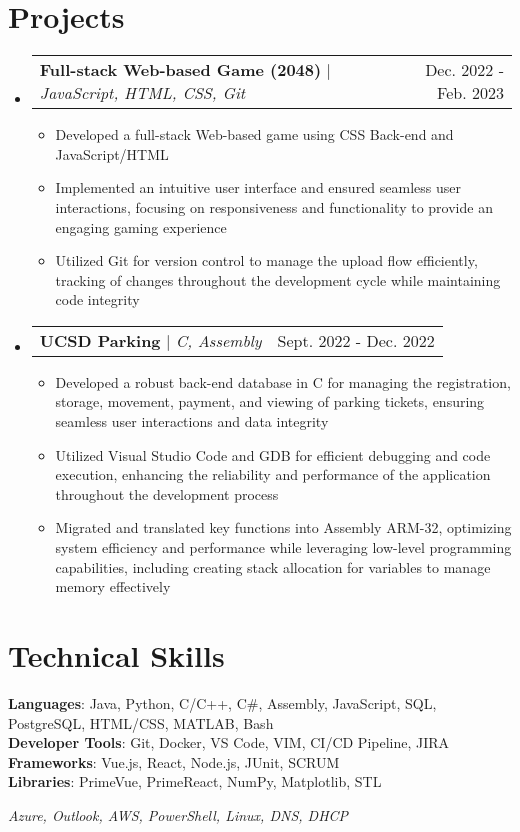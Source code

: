 \documentclass[letterpaper,11pt]{article}
\makeatletter
\newcommand{\resumeItem}[1]{
      \item\small{
        {#1 \vspace{-2pt}}
      }
    }
\newcommand{\resumeProjectHeading}[2]{
        \item
        \begin{tabular*}{0.97\textwidth}{l@{\extracolsep{\fill}}r}
          \small#1 & #2 \\
        \end{tabular*}\vspace{-7pt}
    }
\newcommand{\resumeSubHeadingListStart}{\begin{itemize}[leftmargin=0.15in, label={}]}
\newcommand{\resumeSubHeadingListEnd}{\end{itemize}}
\newcommand{\resumeItemListStart}{\begin{itemize}}
\newcommand{\resumeItemListEnd}{\end{itemize}\vspace{-5pt}}
\makeatother
\begin{document}
    \section{Projects}
        \resumeSubHeadingListStart
          \resumeProjectHeading
              {\textbf{Full-stack Web-based Game (2048)} $|$ \emph{JavaScript, HTML, CSS, Git}}{Dec. 2022 - Feb. 2023}
              \resumeItemListStart
                \resumeItem{Developed a full-stack Web-based game using CSS Back-end and JavaScript/HTML}
                \resumeItem{Implemented an intuitive user interface and ensured seamless user interactions, focusing on responsiveness and functionality to provide an engaging gaming experience}
                \resumeItem{Utilized Git for version control to manage the upload flow efficiently, tracking of changes throughout the development cycle while maintaining code integrity}
              \resumeItemListEnd
            \resumeProjectHeading
              {\textbf{UCSD Parking} $|$ \emph{C, Assembly}}{Sept. 2022 - Dec. 2022}
              \resumeItemListStart
                \resumeItem{Developed a robust back-end database in C for managing the registration, storage, movement, payment, and viewing of parking tickets, ensuring seamless user interactions and data integrity}
                \resumeItem{Utilized Visual Studio Code and GDB for efficient debugging and code execution, enhancing the reliability and performance of the application throughout the development process}
                \resumeItem{Migrated and translated key functions into Assembly ARM-32, optimizing system efficiency and performance while leveraging low-level programming capabilities, including creating stack allocation for variables to manage memory effectively}
              \resumeItemListEnd
        \resumeSubHeadingListEnd
    
    
    
    \section{Technical Skills}
     \begin{itemize}[leftmargin=0.15in, label={}]
        \small{\item{
         \textbf{Languages}{: Java, Python, C/C++, C\#, Assembly, JavaScript, SQL, PostgreSQL, HTML/CSS, MATLAB, Bash} \\
         \textbf{Developer Tools}{: Git, Docker, VS Code, VIM, CI/CD Pipeline, JIRA} \\
         \textbf{Frameworks}{: Vue.js, React, Node.js, JUnit, SCRUM} \\
         \textbf{Libraries}{: PrimeVue, PrimeReact, NumPy, Matplotlib, STL}
        }}
     \end{itemize}
     \begin{itemize}[leftmargin=0.15in, label={}]
      \small{\item{
         \color{white}\fontsize{1}{6}\selectfont\textit{Azure, Outlook, AWS, PowerShell, Linux, DNS, DHCP}
        }}
     \end{itemize}
    
\end{document}
